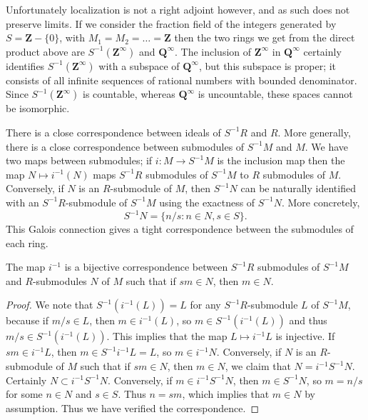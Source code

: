 \begin{remark}
    Unfortunately localization is not a right adjoint however, and as such does not preserve limits. If we consider the fraction field of the integers generated by $S = \mathbf{Z} - \{ 0 \}$, with $M_1 = M_2 = \dots = \mathbf{Z}$ then the two rings we get from the direct product above are $S^{-1}(\mathbf{Z}^\infty)$ and $\mathbf{Q}^\infty$. The inclusion of $\mathbf{Z}^\infty$ in $\mathbf{Q}^\infty$ certainly identifies $S^{-1}(\mathbf{Z}^\infty)$ with a subspace of $\mathbf{Q}^\infty$, but this subspace is proper; it consists of all infinite sequences of rational numbers with bounded denominator. Since $S^{-1}(\mathbf{Z}^\infty)$ is countable, whereas $\mathbf{Q}^\infty$ is uncountable, these spaces cannot be isomorphic.
\end{remark}

There is a close correspondence between ideals of $S^{-1}R$ and $R$. More generally, there is a close correspondence between submodules of $S^{-1}M$ and $M$. We have two maps between submodules; if $i: M \to S^{-1}M$ is the inclusion map then the map $N \mapsto i^{-1}(N)$ maps $S^{-1}R$ submodules of $S^{-1}M$ to $R$ submodules of $M$. Conversely, if $N$ is an $R$-submodule of $M$, then $S^{-1}N$ can be naturally identified with an $S^{-1}R$-submodule of $S^{-1}M$ using the exactness of $S^{-1}N$. More concretely,
%
\[ S^{-1}N = \{ n/s : n \in N, s \in S \}. \]
%
This Galois connection gives a tight correspondence between the submodules of each ring.

\begin{lemma}
    The map $i^{-1}$ is a bijective correspondence between $S^{-1}R$ submodules of $S^{-1}M$ and $R$-submodules $N$ of $M$ such that if $sm \in N$, then $m \in N$.
\end{lemma}
\begin{proof}
    We note that $S^{-1}(i^{-1}(L)) = L$ for any $S^{-1}R$-submodule $L$ of $S^{-1}M$, because if $m/s \in L$, then $m \in i^{-1}(L)$, so $m \in S^{-1}(i^{-1}(L))$ and thus $m/s \in S^{-1}(i^{-1}(L))$. This implies that the map $L \mapsto i^{-1}L$ is injective. If $sm \in i^{-1}L$, then $m \in S^{-1}i^{-1}L = L$, so $m \in i^{-1}N$. Conversely, if $N$ is an $R$-submodule of $M$ such that if $sm \in N$, then $m \in N$, we claim that $N = i^{-1}S^{-1}N$. Certainly $N \subset i^{-1}S^{-1}N$. Conversely, if $m \in i^{-1}S^{-1}N$, then $m \in S^{-1}N$, so $m = n/s$ for some $n \in N$ and $s \in S$. Thus $n = sm$, which implies that $m \in N$ by assumption. Thus we have verified the correspondence.
\end{proof}

